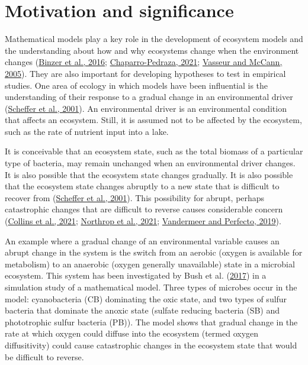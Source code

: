\documentclass[
]{article}
\begin{document}
\hypertarget{motivation-and-significance}{%
\section{Motivation and
significance}\label{motivation-and-significance}}

Mathematical models play a key role in the development of ecosystem
models and the understanding about how and why ecosystems change when
the environment changes (\protect\hyperlink{ref-Binzer2016a}{Binzer et
al., 2016};
\protect\hyperlink{ref-Chaparro-Pedraza2021}{Chaparro-Pedraza, 2021};
\protect\hyperlink{ref-Vasseur2005}{Vasseur and McCann, 2005}). They are
also important for developing hypotheses to test in empirical studies.
One area of ecology in which models have been influential is the
understanding of their response to a gradual change in an environmental
driver (\protect\hyperlink{ref-Scheffer2001}{Scheffer et al., 2001}). An
environmental driver is an environmental condition that affects an
ecosystem. Still, it is assumed not to be affected by the ecosystem,
such as the rate of nutrient input into a lake.

It is conceivable that an ecosystem state, such as the total biomass of
a particular type of bacteria, may remain unchanged when an
environmental driver changes. It is also possible that the ecosystem
state changes gradually. It is also possible that the ecosystem state
changes abruptly to a new state that is difficult to recover from
(\protect\hyperlink{ref-Scheffer2001}{Scheffer et al., 2001}). This
possibility for abrupt, perhaps catastrophic changes that are difficult
to reverse causes considerable concern
(\protect\hyperlink{ref-Collins2021}{Collins et al., 2021};
\protect\hyperlink{ref-Northrop2021}{Northrop et al., 2021};
\protect\hyperlink{ref-Vandermeer2019}{Vandermeer and Perfecto, 2019}).

An example where a gradual change of an environmental variable causes an
abrupt change in the system is the switch from an aerobic (oxygen is
available for metabolism) to an anaerobic (oxygen generally unavailable)
state in a microbial ecosystem. This system has been investigated by
Bush et al. (\protect\hyperlink{ref-Bush2017}{2017}) in a simulation
study of a mathematical model. Three types of microbes occur in the
model: cyanobacteria (CB) dominating the oxic state, and two types of
sulfur bacteria that dominate the anoxic state (sulfate reducing
bacteria (SB) and phototrophic sulfur bacteria (PB)). The model shows
that gradual change in the rate at which oxygen could diffuse into the
ecosystem (termed oxygen diffusitivity) could cause catastrophic changes
in the ecosystem state that would be difficult to reverse.
\end{document}

